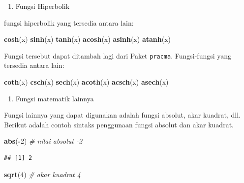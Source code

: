 \documentclass[
]{book}
\newenvironment{Shaded}{\begin{snugshade}}{\end{snugshade}}
\newcommand{\CommentTok}[1]{\textcolor[rgb]{0.56,0.35,0.01}{\textit{#1}}}
\newcommand{\DecValTok}[1]{\textcolor[rgb]{0.00,0.00,0.81}{#1}}
\newcommand{\FunctionTok}[1]{\textcolor[rgb]{0.13,0.29,0.53}{\textbf{#1}}}
\newcommand{\NormalTok}[1]{#1}
\newcommand{\SpecialCharTok}[1]{\textcolor[rgb]{0.81,0.36,0.00}{\textbf{#1}}}
\providecommand{\tightlist}{%
  \setlength{\itemsep}{0pt}\setlength{\parskip}{0pt}}
\theoremstyle{definition}
\theoremstyle{definition}
\theoremstyle{definition}
\theoremstyle{definition}
\theoremstyle{remark}
\begin{document}
\begin{enumerate}
\def\labelenumi{\arabic{enumi}.}
\setcounter{enumi}{2}
\tightlist
\item
  Fungsi Hiperbolik
\end{enumerate}

fungsi hiperbolik yang tersedia antara lain:

\begin{Shaded}
\begin{Highlighting}[]
\FunctionTok{cosh}\NormalTok{(x) }
\FunctionTok{sinh}\NormalTok{(x)}
\FunctionTok{tanh}\NormalTok{(x)}
\FunctionTok{acosh}\NormalTok{(x)}
\FunctionTok{asinh}\NormalTok{(x)}
\FunctionTok{atanh}\NormalTok{(x)}
\end{Highlighting}
\end{Shaded}

Fungsi tersebut dapat ditambah lagi dari Paket \texttt{pracma}. Fungsi-fungsi yang tersedia antara lain:

\begin{Shaded}
\begin{Highlighting}[]
\FunctionTok{coth}\NormalTok{(x)}
\FunctionTok{csch}\NormalTok{(x)}
\FunctionTok{sech}\NormalTok{(x)}
\FunctionTok{acoth}\NormalTok{(x)}
\FunctionTok{acsch}\NormalTok{(x)}
\FunctionTok{asech}\NormalTok{(x)}
\end{Highlighting}
\end{Shaded}

\begin{enumerate}
\def\labelenumi{\arabic{enumi}.}
\setcounter{enumi}{3}
\tightlist
\item
  Fungsi matematik lainnya
\end{enumerate}

Fungsi lainnya yang dapat digunakan adalah fungsi absolut, akar kuadrat, dll. Berikut adalah contoh sintaks penggunaan fungsi absolut dan akar kuadrat.

\begin{Shaded}
\begin{Highlighting}[]
\FunctionTok{abs}\NormalTok{(}\SpecialCharTok{{-}}\DecValTok{2}\NormalTok{) }\CommentTok{\# nilai absolut {-}2}
\end{Highlighting}
\end{Shaded}

\begin{verbatim}
## [1] 2
\end{verbatim}

\begin{Shaded}
\begin{Highlighting}[]
\FunctionTok{sqrt}\NormalTok{(}\DecValTok{4}\NormalTok{) }\CommentTok{\# akar kuadrat 4}
\end{Highlighting}
\end{Shaded}
\end{document}
